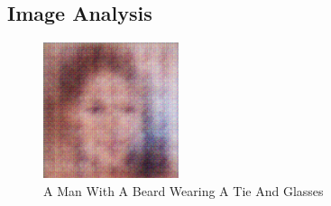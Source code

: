\documentclass{article}%
\begin{document}
%
\subsection{Image Analysis}%
\label{subsec:ImageAnalysis}%


\begin{figure}[h!]%
\centering%
\includegraphics[width=150px]{500_fake_images/samples_5_181.png}%
\caption{A Man With A Beard Wearing A Tie And Glasses}%
\end{figure}

%
\end{document}
